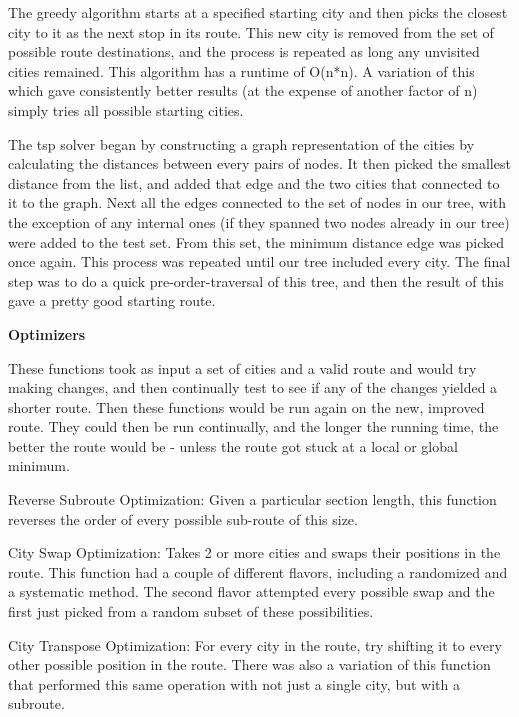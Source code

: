 \documentclass[letterpaper,10pt,titlepage,fleqn]{article}
\begin{document}
The greedy algorithm starts at a specified starting city and then picks the closest city to it as the next stop in its route. This new city is removed from the set of possible route destinations, and the process is repeated as long any unvisited cities remained. This algorithm has a runtime of O(n*n). A variation of this which gave consistently better results (at the expense of another factor of n) simply tries all possible starting cities. 

The tsp solver began by constructing a graph representation of the cities by calculating the distances between every pairs of nodes. It then picked the smallest distance from the list, and added that edge and the two cities that connected to it to the graph. Next all the edges connected to the set of nodes in our tree, with the exception of any internal ones (if they spanned two nodes already in our tree) were added to the test set. From this set, the minimum distance edge was picked once again. This process was repeated until our tree included every city. The final step was to do a quick pre-order-traversal of this tree, and then the result of this gave a pretty good starting route.

\begin{Large}
\textbf{Optimizers} \\
\end{Large}
These functions took as input a set of cities and a valid route and would try making changes, and then continually test to see if any of the changes yielded a shorter route. Then these functions would be run again on the new, improved route. They could then be run continually, and the longer the running time, the better the route would be - unless the route got stuck at a local or global minimum.

Reverse Subroute Optimization: Given a particular section length, this function reverses the order of every possible sub-route of this size.

City Swap Optimization: Takes 2 or more cities and swaps their positions in the route. This function had a couple of different flavors, including a randomized and a systematic method. The second flavor attempted every possible swap and the first just picked from a random subset of these possibilities.

City Transpose Optimization: For every city in the route, try shifting it to every other possible position in the route. There was also a variation of this function that performed this same operation with not just a single city, but with a subroute.
\end{document}
